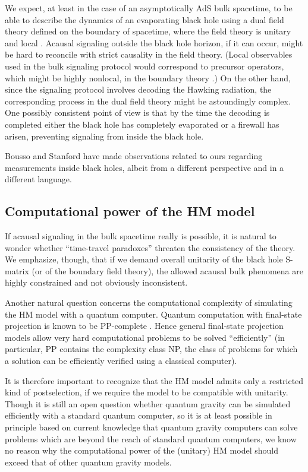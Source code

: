 \documentclass[11pt]{article}
\begin{document}
We expect, at least in the case of an asymptotically AdS bulk spacetime, to be able to describe the dynamics of an evaporating black hole using a dual field theory defined on the boundary of spacetime, where the field theory is unitary and local \cite{ads-cft}.  Acausal signaling outside the black hole horizon, if it can occur, might be hard to reconcile with strict causality in the field theory. (Local observables used in the bulk signaling protocol would correspond to precursor operators, which might be highly nonlocal, in the boundary theory \cite{precursor}.) On the other hand, since the signaling protocol involves decoding the Hawking radiation, the corresponding process in the dual field theory might be astoundingly complex. One possibly consistent point of view is that by the time the decoding is completed either the black hole has completely evaporated or a firewall has arisen, preventing signaling from inside the black hole. 

Bousso and Stanford \cite{bousso-stanford} have made observations related to ours regarding measurements inside black holes, albeit from a different perspective and in a different language. 

\subsection{Computational power of the HM model}

If acausal signaling in the bulk spacetime really is possible, it is natural to wonder whether ``time-travel paradoxes'' threaten the consistency of the theory. We emphasize, though, that if we demand overall unitarity of the black hole S-matrix (or of the boundary field theory), the allowed acausal bulk phenomena are highly constrained and not obviously inconsistent. 

Another natural question concerns the computational complexity of simulating the HM model with a quantum computer. Quantum computation with final-state projection is known to be PP-complete  \cite{aaronson}. Hence general final-state projection models allow very hard computational problems to be solved ``efficiently'' (in particular, PP contains the complexity class NP, the class of problems for which a solution can be efficiently verified using a classical computer). 

It is therefore important to recognize that the HM model admits only a restricted kind of postselection, if we require the model to be compatible with unitarity. Though it is still an open question whether quantum gravity can be simulated efficiently with a standard quantum computer, so it is at least possible in principle based on current knowledge that quantum gravity computers can solve problems which are beyond the reach of standard quantum computers, we know no reason why the computational power of the (unitary) HM model should exceed that of other quantum gravity models. 
\end{document}
